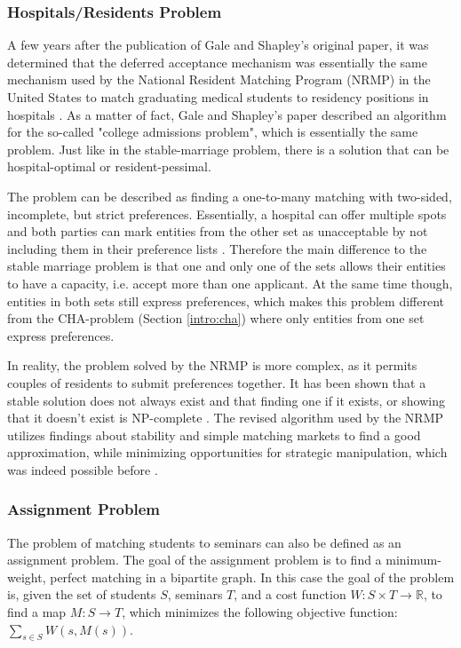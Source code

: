 \subsubsection{Hospitals/Residents Problem}\label{intro:hospital-residents}
A few years after the publication of Gale and Shapley's original paper, it was determined that the deferred acceptance mechanism was essentially the same mechanism used by the National Resident Matching Program (NRMP) in the United States to match graduating medical students to residency positions in hospitals \cite{Gusfield}. As a matter of fact, Gale and Shapley's paper described an algorithm for the so-called "college admissions problem"\cite{GaleShapleyOrig}, which is essentially the same problem. Just like in the stable-marriage problem, there is a solution that can be hospital-optimal or resident-pessimal. 

The problem can be described as finding a one-to-many matching with two-sided, incomplete, but strict preferences. Essentially, a hospital can offer multiple spots and both parties can mark entities from the other set as unacceptable by not including them in their preference lists \cite{RePEc:ris:nobelp:2012_005}. Therefore the main difference to the stable marriage problem is that one and only one of the sets allows their entities to have a capacity, i.e. accept more than one applicant. At the same time though, entities in both sets still express preferences, which makes this problem different from the CHA-problem (Section \ref{intro:cha}) where only entities from one set express preferences.

In reality, the problem solved by the NRMP is more complex, as it permits couples of residents to submit preferences together. It has been shown that a stable solution does not always exist and that finding one if it exists, or showing that it doesn't exist is NP-complete \cite{RONN1990285}. The revised algorithm used by the NRMP utilizes findings about stability and simple matching markets to find a good approximation, while minimizing opportunities for strategic manipulation, which was indeed possible before \cite{NBERw6963}.

\subsubsection{Assignment Problem}\label{intro_assignment}
The problem of matching students to seminars can also be defined as an assignment problem. The goal of the assignment problem is to find a minimum-weight, perfect matching in a bipartite graph. In this case the goal of the problem is, given the set of students $S$, seminars $T$, and a cost function $W: S \times T \rightarrow \mathbb{R}$, to find a map $M: S \rightarrow T$, which minimizes the following objective function:
$\sum_{s \in S} W(s, M(s))$.


